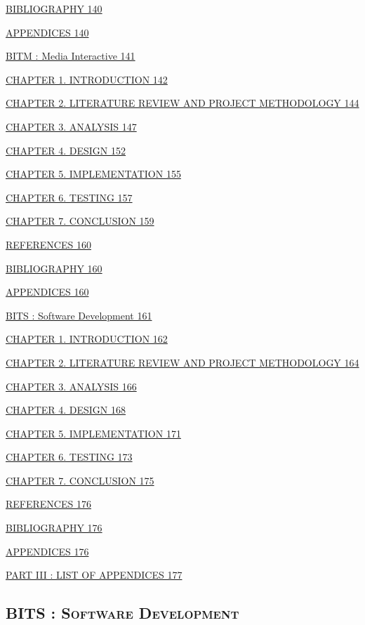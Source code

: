 \hyperref[_bookmark70]{BIBLIOGRAPHY 140}

\hyperref[_bookmark71]{APPENDICES 140}

\hyperref[_bookmark72]{BITM : Media Interactive 141}

\hyperref[_bookmark73]{CHAPTER 1. INTRODUCTION 142}

\hyperref[_bookmark74]{CHAPTER 2. LITERATURE REVIEW AND PROJECT
METHODOLOGY 144}

\hyperref[_bookmark75]{CHAPTER 3. ANALYSIS 147}

\hyperref[_bookmark76]{CHAPTER 4. DESIGN 152}

\hyperref[_bookmark77]{CHAPTER 5. IMPLEMENTATION 155}

\hyperref[_bookmark78]{CHAPTER 6. TESTING 157}

\hyperref[_bookmark79]{CHAPTER 7. CONCLUSION 159}

\hyperref[_bookmark80]{REFERENCES 160}

\hyperref[_bookmark81]{BIBLIOGRAPHY 160}

\hyperref[_bookmark82]{APPENDICES 160}

\hyperref[bits-software-development]{BITS : Software Development 161}

\hyperref[chapter-1.-introduction]{CHAPTER 1. INTRODUCTION 162}

\hyperref[chapter-2.-literature-review-and-project-methodology]{CHAPTER
2. LITERATURE REVIEW AND PROJECT METHODOLOGY 164}

\hyperref[chapter-3.-analysis]{CHAPTER 3. ANALYSIS 166}

\hyperref[chapter-4.-design]{CHAPTER 4. DESIGN 168}

\hyperref[chapter-5.-implementation]{CHAPTER 5. IMPLEMENTATION 171}

\hyperref[chapter-6.-testing]{CHAPTER 6. TESTING 173}

\hyperref[chapter-7.-conclusion]{CHAPTER 7. CONCLUSION 175}

\hyperref[references]{REFERENCES 176}

\hyperref[bibliography]{BIBLIOGRAPHY 176}

\hyperref[appendices]{APPENDICES 176}

\hyperref[part-iii-list-of-appendices]{PART III : LIST OF APPENDICES
177}

\protect{}\label{_bookmark0}{}

\subsection{\texorpdfstring{\textsc{BITS : Software
Development}}{BITS : Software Development}}\label{bits-software-development}

